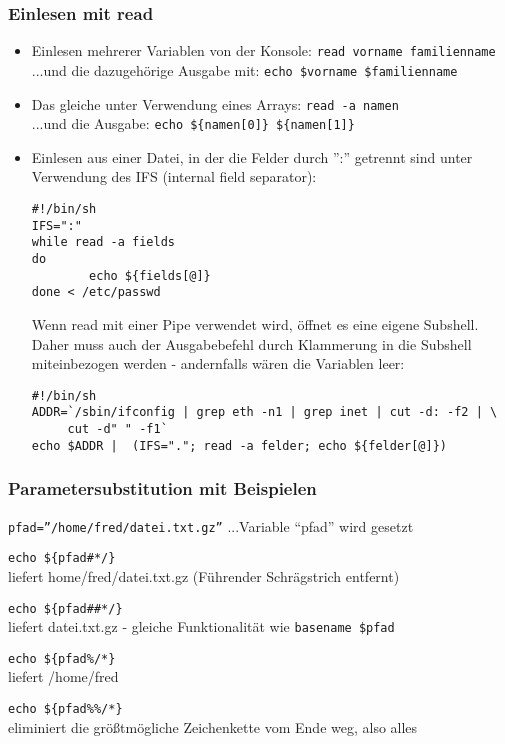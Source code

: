 \documentclass[11pt]{article}
\begin{document}
\subsubsection{Einlesen mit read}
\begin{itemize}
\item Einlesen mehrerer Variablen von der Konsole:
\texttt{read vorname familienname}\\
...und die dazugehörige Ausgabe mit:
\texttt{echo \$vorname \$familienname}

\item Das gleiche unter Verwendung eines Arrays:
\texttt{read -a namen}\\
...und die Ausgabe:
\texttt{echo \$\{namen[0]\} \$\{namen[1]\}}

\item Einlesen aus einer Datei, in der die Felder durch '':'' getrennt
sind unter Verwendung des IFS (internal field separator):
\begin{verbatim}
#!/bin/sh
IFS=":"
while read -a fields
do
        echo ${fields[@]}
done < /etc/passwd
\end{verbatim}

Wenn read mit einer Pipe verwendet wird, öffnet es eine eigene Subshell.
Daher muss auch der Ausgabebefehl durch Klammerung in die Subshell
miteinbezogen werden - andernfalls wären die Variablen leer:
\begin{verbatim}
#!/bin/sh
ADDR=`/sbin/ifconfig | grep eth -n1 | grep inet | cut -d: -f2 | \
     cut -d" " -f1`
echo $ADDR |  (IFS="."; read -a felder; echo ${felder[@]})
\end{verbatim}
\end{itemize}

\subsubsection{Parametersubstitution mit Beispielen}
\texttt{pfad=''/home/fred/datei.txt.gz''} ...Variable ``pfad'' wird
gesetzt

\texttt{echo \$\{pfad\#*/\}}\\
liefert home/fred/datei.txt.gz (Führender Schrägstrich entfernt)

\texttt{echo \$\{pfad\#\#*/\}}\\
liefert datei.txt.gz - gleiche Funktionalität wie 
\texttt{basename \$pfad}

\texttt{echo \$\{pfad\%/*\}}\\
liefert /home/fred

\texttt{echo \$\{pfad\%\%/*\}}\\
eliminiert die größtmögliche Zeichenkette vom Ende weg, also alles
\end{document}
